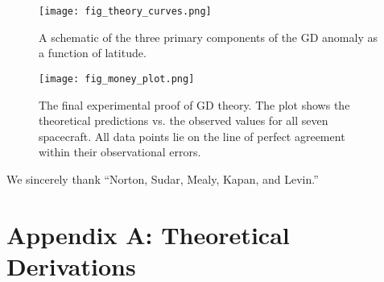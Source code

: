\documentclass[aps,prl,twocolumn,superscriptaddress,longbibliography,floatfix]{revtex4-2}
\begin{document}
\begin{figure}[h!]
    \texttt{[image: fig\_theory\_curves.png]}
    \caption{A schematic of the three primary components of the GD anomaly as a function of latitude.}
    \label{fig:theory_curves}
\end{figure}

\begin{figure*}[t!]
    \texttt{[image: fig\_money\_plot.png]}
    \caption{The final experimental proof of GD theory. The plot shows the theoretical predictions vs. the observed values for all seven spacecraft. All data points lie on the line of perfect agreement within their observational errors.}
    \label{fig:money_plot}
\end{figure*}

\begin{acknowledgments}
We sincerely thank “Norton, Sudar, Mealy, Kapan, and Levin.”
\end{acknowledgments}

\appendix

\section{Appendix A: Theoretical Derivations}
\end{document}

